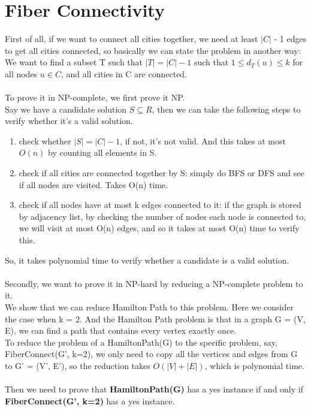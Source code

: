 \documentclass[a4paper]{article}
\begin{document}
\section{Fiber Connectivity}
First of all, if we want to connect all cities together, we need at least $|C|$ - 1 edges
to get all cities connected, so basically we can state the problem in another way: \\
We want to find a subset T such that $|T| = |C| - 1$ such that $1 \leq d_{T}(u) \leq k$
for all nodes $u \in C$, and all cities in C are connected.\\
\\
To prove it in NP-complete, we first prove it NP. \\
Say we have a candidate solution $S \subseteq R$, then we can take the following steps to
verify whether it's a valid solution. \\
\begin{enumerate}
	\item check whether $|S| = |C| - 1$, if not, it's not valid. And this takes at most $O(n)$
	by counting all elements in S.
	\item check if all cities are connected together by S: simply do BFS or DFS and see if all nodes are
	visited. Takes O(n) time.
	\item check if all nodes have at most k edges connected to it: if the graph is stored by adjacency list,
	by checking the number of nodes each node is connected to, we will visit at most O(n) edges, and so it
	takes at most O(n) time to verify this.
\end{enumerate}
So, it takes polynomial time to verify whether a candidate is a valid solution.\\
\\
Secondly, we want to prove it in NP-hard by reducing a NP-complete problem to it. \\
We show that we can reduce Hamilton Path to this problem. Here we consider the case
when k = 2. And the Hamilton Path problem is that in a graph G = (V, E), we can find
a path that contains every vertex exactly once.\\
To reduce the problem of a HamiltonPath(G) to the specific problem, say, FiberConnect(G', k=2),
we only need to copy all the vertices and edges from G to G' = (V', E'), so the reduction takes $O(|V|+|E|)$,
which is polynomial time.\\
\\
Then we need to prove that \textbf{HamiltonPath(G)} has a yes instance if and only if
\textbf{FiberConnect(G', k=2)} has a yes instance.
\end{document}
